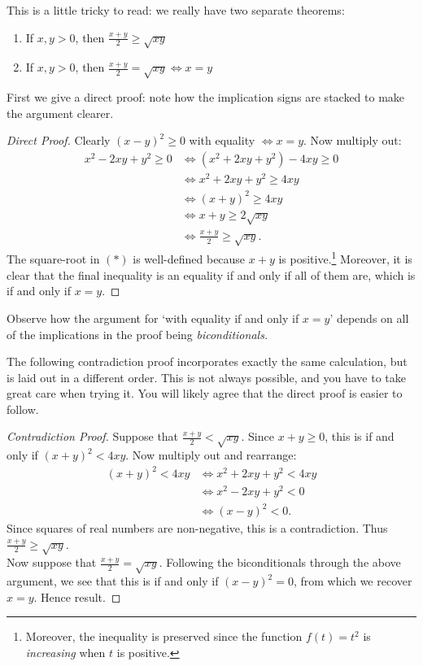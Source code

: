  This is a little tricky to read: we really have two separate theorems:
\begin{enumerate}
  \item If $x,y>0$, then $\frac{x+y}{2}\ge\sqrt{xy}$
  \item If $x,y>0$, then $\frac{x+y}{2}=\sqrt{xy}\iff x=y$
\end{enumerate}

 First we give a direct proof: note how the implication signs are stacked to make the argument clearer.

\begin{proof}[Direct Proof]
Clearly $(x-y)^2\ge 0$ with equality $\iff x=y$. Now multiply out:
\begin{align*}
x^2-2xy+y^2\ge 0&\iff (x^2+2xy+y^2)- 4xy  \ge 0 \\
&\iff x^2+2xy+y^2\ge 4xy\\
&\iff (x+y)^2\ge 4xy\\
&\iff x+y\ge 2\sqrt{xy}\tag*{($\ast$)}\\
&\iff \frac{x+y}{2}\ge \sqrt{xy}.
\end{align*}
The square-root in $(\ast)$ is well-defined because $x+y$ is positive.\footnote{Moreover, the inequality is preserved since the function $f(t)=t^2$ is \emph{increasing} when $t$ is positive.} Moreover, it is clear that the final inequality is an equality if and only if all of them are, which is if and only if $x=y$.
\end{proof}

 Observe how the argument for `with equality if and only if $x=y$' depends on all of the implications in the proof being \emph{biconditionals.}\pagebreak

 The following contradiction proof incorporates exactly the same calculation, but is laid out in a different order. This is not always possible, and you have to take great care when trying it. You will likely agree that the direct proof is easier to follow.

\begin{proof}[Contradiction Proof]
Suppose that $\frac{x+y}{2}<\sqrt{xy}$. Since $x+y\ge 0$, this is if and only if $(x+y)^2<4xy$. Now multiply out and rearrange:
\begin{align*}
(x+y)^2<4xy&\iff x^2+2xy+y^2<4xy\\
&\iff x^2-2xy+y^2<0\\
&\iff (x-y)^2<0.
\end{align*}
Since squares of real numbers are non-negative, this is a contradiction. Thus $\frac{x+y}{2}\ge \sqrt{xy}$.\\
Now suppose that $\frac{x+y}{2}=\sqrt{xy}$. Following the biconditionals through the above argument, we see that this is if and only if $(x-y)^2=0$, from which we recover $x=y$. Hence result.
\end{proof}


